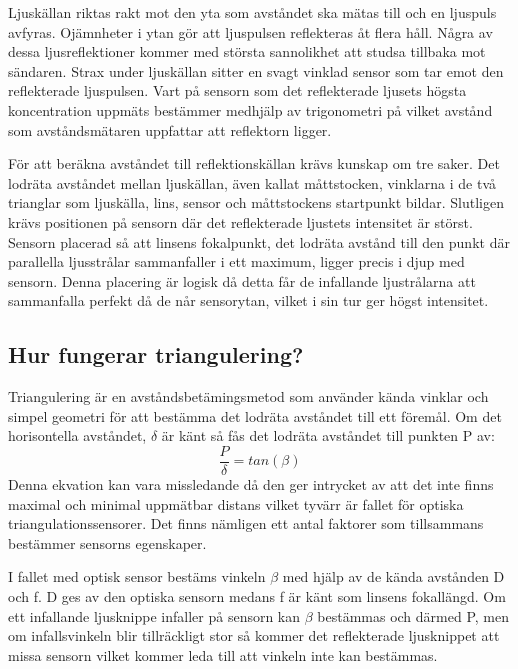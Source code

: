 \documentclass[a4paper,12pt,fleqn]{article}
\begin{document}
Ljuskällan riktas rakt mot den yta som avståndet ska mätas till och en ljuspuls avfyras. Ojämnheter i ytan gör att ljuspulsen reflekteras åt flera håll. Några av dessa ljusreflektioner kommer med största sannolikhet att studsa tillbaka mot sändaren.
Strax under ljuskällan sitter en svagt vinklad sensor som tar emot den reflekterade ljuspulsen.  Vart på sensorn som det reflekterade ljusets högsta koncentration uppmäts bestämmer medhjälp av trigonometri på vilket avstånd som avståndsmätaren uppfattar att reflektorn ligger.


För att beräkna avståndet till reflektionskällan krävs kunskap om tre saker.
Det lodräta avståndet mellan ljuskällan, även kallat måttstocken, vinklarna i de två trianglar som ljuskälla, lins, sensor och måttstockens startpunkt bildar. Slutligen krävs positionen på sensorn där det reflekterade ljustets intensitet är störst. Sensorn placerad så att linsens fokalpunkt, det lodräta avstånd till den punkt där parallella ljusstrålar sammanfaller i ett maximum, ligger precis i djup med sensorn. Denna placering är logisk då detta får de infallande ljustrålarna att sammanfalla perfekt då de når sensorytan, vilket i sin tur ger högst intensitet.

\subsection{Hur fungerar triangulering?}
Triangulering är en avståndsbetämingsmetod som använder kända vinklar och simpel geometri för att bestämma det lodräta avståndet till ett föremål.
Om det horisontella avståndet, \begin{math}\delta\end{math} är känt så fås det lodräta avståndet till punkten P av:
\begin{equation}
\label{eq:angle}
\frac{P}{\delta}=tan(\beta)
\end{equation}
Denna ekvation kan vara missledande då den ger intrycket av att det inte finns maximal och minimal uppmätbar distans vilket tyvärr är fallet för optiska triangulationssensorer.
Det finns nämligen ett antal faktorer som tillsammans bestämmer sensorns egenskaper.

I fallet med optisk sensor bestäms vinkeln \begin{math}\beta\end{math} med hjälp av de kända avstånden D och f. D ges av den optiska sensorn medans f är känt som linsens fokallängd. Om ett infallande ljusknippe infaller på sensorn kan \begin{math}\beta\end{math} bestämmas och därmed P, men om  infallsvinkeln blir tillräckligt stor så kommer det reflekterade ljusknippet att missa sensorn vilket kommer leda till att vinkeln inte kan bestämmas.
\end{document}
